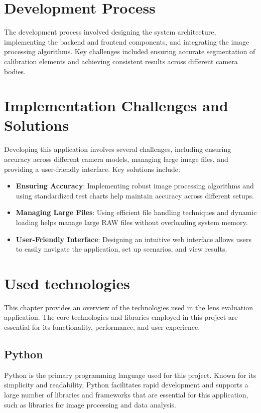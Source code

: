 
\section{Development Process}
The development process involved designing the system architecture, implementing the backend and frontend components, and integrating the image processing algorithms. Key challenges included ensuring accurate segmentation of calibration elements and achieving consistent results across different camera bodies.

\section{Implementation Challenges and Solutions}
Developing this application involves several challenges, including ensuring accuracy across different camera models, managing large image files, and providing a user-friendly interface. Key solutions include:

\begin{itemize}
    \item \textbf{Ensuring Accuracy}: Implementing robust image processing algorithms and using standardized test charts help maintain accuracy across different setups.
    \item \textbf{Managing Large Files}: Using efficient file handling techniques and dynamic loading helps manage large RAW files without overloading system memory.
    \item \textbf{User-Friendly Interface}: Designing an intuitive web interface allows users to easily navigate the application, set up scenarios, and view results.
\end{itemize}

\section{Used technologies}
This chapter provides an overview of the technologies used in the lens evaluation application. The core technologies and libraries employed in this project are essential for its functionality, performance, and user experience.

\subsection{Python}
Python is the primary programming language used for this project. Known for its simplicity and readability, Python facilitates rapid development and supports a large number of libraries and frameworks that are essential for this application, such as libraries for image processing and data analysis.

